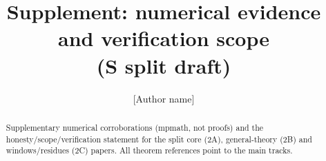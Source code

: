 


\title{Supplement: numerical evidence and verification scope\\(S split draft)}
\author{[Author name]\\ \relax[Affiliation]}


\maketitle

\begin{abstract}
Supplementary numerical corroborations (mpmath, not proofs) and the
honesty/scope/verification statement for the split core (2A), general-theory
(2B) and windows/residues (2C) papers. All theorem references point to the
main tracks.
\end{abstract}



